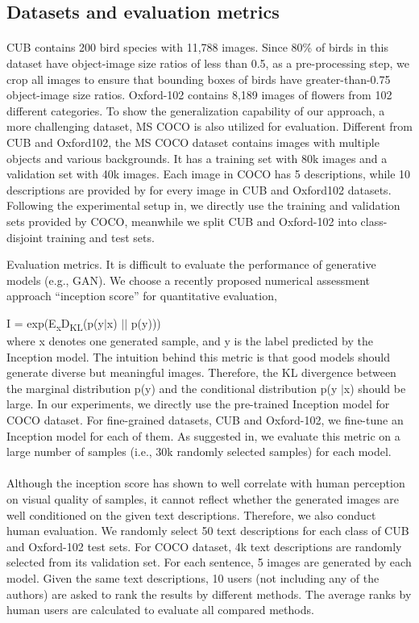 \documentclass[a4paper,12pt,oneside]{article}
\begin{document}
\subsection{Datasets and evaluation metrics }
\paragraph{}

CUB contains 200 bird species with 11,788 images. Since 80\% of birds in this dataset have object-image size ratios of less than 0.5, as a pre-processing step, we crop all images to ensure that bounding boxes of birds have greater-than-0.75 object-image size ratios. Oxford-102 contains 8,189 images of flowers from 102 different categories. To show the generalization capability of our approach, a more challenging dataset, MS COCO is also utilized for evaluation. Different from CUB and Oxford102, the MS COCO dataset contains images with multiple objects and various backgrounds. It has a training set with 80k images and a validation set with 40k images. Each image in COCO has 5 descriptions, while 10 descriptions are provided by for every image in CUB and Oxford102 datasets. Following the experimental setup in, we directly use the training and validation sets provided by COCO, meanwhile we split CUB and Oxford-102 into class-disjoint training and test sets. 

Evaluation metrics. It is difficult to evaluate the performance of generative models (e.g., GAN). We choose a recently proposed numerical assessment approach “inception score” for quantitative evaluation, 

I = exp(E\textsubscript{x}D\textsubscript{KL}(p(y$\mid$x) $\mid$$\mid$ p(y)))
\\
where x denotes one generated sample, and y is the label predicted by the Inception model. The intuition behind this metric is that good models should generate diverse but meaningful images. Therefore, the KL divergence between the marginal distribution p(y) and the conditional distribution p(y $\mid$x) should be large. In our experiments, we directly use the pre-trained Inception model for COCO dataset. For fine-grained datasets, CUB and Oxford-102, we fine-tune an Inception model for each of them. As suggested in, we evaluate this metric on a large number of samples (i.e., 30k randomly selected samples) for each model. 

\paragraph{}
Although the inception score has shown to well correlate with human perception on visual quality of samples, it cannot reflect whether the generated images are well conditioned on the given text descriptions. Therefore, we also conduct human evaluation. We randomly select 50 text descriptions for each class of CUB and Oxford-102 test sets. For COCO dataset, 4k text descriptions are randomly selected from its validation set. For each sentence, 5 images are generated by each model. Given the same text descriptions, 10 users (not including any of the authors) are asked to rank the results by different methods. The average ranks by human users are calculated to evaluate all compared methods. 
\end{document}
